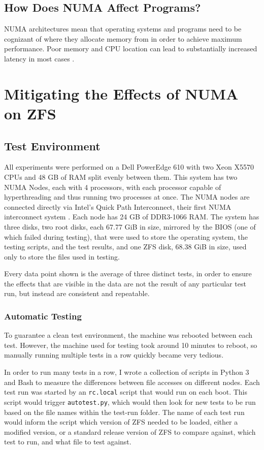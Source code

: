 \section{How Does NUMA Affect Programs?}
NUMA architectures mean that operating systems and programs need to be cognizant of where they allocate memory from in order to achieve maximum performance.
Poor memory and CPU location can lead to substantially increased latency in most cases \cite{lameter_numa_2013}.

\chapter{Mitigating the Effects of NUMA on ZFS}

\section{Test Environment}

All experiments were performed on a Dell PowerEdge 610 with two Xeon X5570 CPUs and 48 GB of RAM split evenly between them.
This system has two NUMA Nodes, each with 4 processors, with each processor capable of hyperthreading
and thus running two processes at once.
The NUMA nodes are connected directly via Intel's Quick Path Interconnect,
their first NUMA interconnect system \cite{kochhar_optimal_2009}.
Each node has 24 GB of DDR3-1066 RAM.
The system has three disks, two root disks, each 67.77 GiB in size,
mirrored by the BIOS (one of which failed during testing),
that were used to store the operating system, the testing scripts, and the test results,
and one ZFS disk, 68.38 GiB in size, used only to store the files used in testing.

Every data point shown is the average of three distinct tests, in order to ensure the effects that are visible in the data are not the result of
any particular test run, but instead are consistent and repeatable.

\subsection{Automatic Testing}
To guarantee a clean test environment, the machine was rebooted between each test.
However, the machine used for testing took around 10 minutes to reboot, so manually running multiple tests in a row
quickly became very tedious.

In order to run many tests in a row, I wrote a collection of scripts in Python 3 and Bash 
to measure the differences between file accesses on different nodes.
Each test run was started by an \texttt{rc.local} script that would run on each boot.
This script would trigger \texttt{autotest.py}, which would then look for new tests to be run based on 
the file names within the test-run folder.
The name of each test run would inform the script which version of ZFS needed to be loaded,
either a modified version, or a standard release version of ZFS to compare against,
which test to run, and what file to test against.

